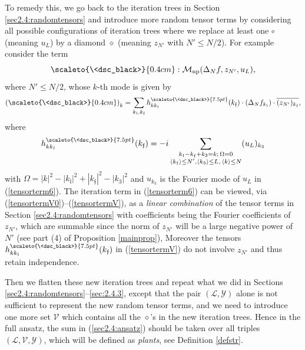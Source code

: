 \documentclass[11 pt,reqno]{amsart}
\theoremstyle{definition}
\theoremstyle{remark}
\numberwithin{equation}{section}
\newcommand{\Lc}{\mathcal{L}}
\newcommand{\Vc}{\mathcal{V}}
\renewcommand{\Mc}{\mathcal{M}}
\newcommand{\Yc}{\mathcal{Y}}
\newcommand{\ff}{\mathfrak{f}}
\newcommand{\lf}{\mathfrak{l}}
\begin{document}
{To remedy this, we go back to the iteration trees in Section \ref{sec2.4:randomtensors} and introduce more random tensor terms by considering all possible configurations of iteration trees where we replace at least one $\circ$ (meaning $u_L$) by a diamond $\diamond$ (meaning $z_{N'}$ with $N'\leq N/2$). For example consider the term \begin{equation}\label{tensorterm6}
\scaleto{\<dsc_black>}{0.4cm}: \Mc_{\mathrm{np}}(\Delta_{N}f, z_{N'}, u_L),
\end{equation} where $N'\leq N/2$, whose $k$-th mode is given by \begin{equation}\label{tensortermV0}
\left(\scaleto{\<dsc_black>}{0.4cm}\right)_k
=\sum_{k_{\lf},k_{\ff}}  
h^{\scaleto{\<dsc_black>}{7.5pt}}_{kk_{\lf}}(k_{\ff})\cdot (\Delta_{N} f_{k_{\lf}})\cdot \overline{(z_{N'})_{k_{\ff}}},
\end{equation}
where
\begin{equation}\label{tensortermV}
h^{\scaleto{\<dsc_black>}{7.5pt}}_{kk_{\lf}}(k_{\ff}) = 
-i \sum_{\substack{k_{\lf}-k_{\ff} +k_3=k;\,\Omega=0\\\langle k_{\ff}\rangle\leq N', \langle k_3\rangle\leq L,\,\langle k\rangle \leq N}} (u_L)_{k_3}
\end{equation}
with $\Omega =|k|^2-|k_{\lf}|^2+ |k_{\ff}|^2-|k_3|^2$ and $u_{k_3}$ is the Fourier mode of $u_L$ in (\ref{tensorterm6}). The iteration term in (\ref{tensorterm6}) can be viewed, via (\ref{tensortermV0})--(\ref{tensortermV}), as a \emph{linear combination} of the tensor terms in Section \ref{sec2.4:randomtensors} with coefficients being the Fourier coefficients of $z_{N'}$, which are summable since the norm of $z_{N'}$ will be a large negative power of $N'$ (see part (4) of Proposition \ref{mainprop}), Moreover the tensors $h^{\scaleto{\<dsc_black>}{7.5pt}}_{kk_{\lf}}(k_{\ff})$ in (\ref{tensortermV}) do not involve $z_{N'}$ and thus retain independence.

Then we flatten these new iteration trees and repeat what we did in Sections \ref{sec2.4:randomtensors}--\ref{sec:2.4.3}, except that the pair $(\Lc,\Yc)$ alone is not sufficient to represent the new random tensor terms, and we need to introduce one more set $\Vc$ which contains all the $\diamond$'s in the new iteration trees. Hence in the full ansatz, the sum in (\ref{sec2.4:ansatz}) should be taken over all triples $(\Lc,\Vc,\Yc)$, which will be defined as \emph{plants}, see Definition \ref{defstr}.
}
\end{document}
